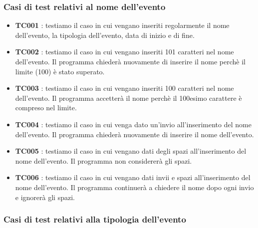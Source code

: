 \documentclass[11pt]{scrartcl} %
\begin{document}
\subsubsection{Casi di test relativi al nome dell'evento}

\begin{itemize}
	\item \textbf{TC001} : testiamo il caso in cui vengano inseriti regolarmente il nome dell’evento, la tipologia dell’evento, data di inizio e di fine.

	\item \textbf{TC002} : testiamo il caso in cui vengano inseriti 101 caratteri nel nome dell’evento. Il programma chiederà nuovamente di inserire il nome perchè il limite (100) è stato superato.

	\item \textbf{TC003} : testiamo il caso in cui vengano inseriti 100 caratteri nel nome dell’evento. Il programma accetterà il nome perchè il 100esimo carattere è compreso nel limite.

	\item \textbf{TC004} : testiamo il caso in cui venga dato un’invio all’inserimento del nome dell’evento. Il programma chiederà nuovamente di inserire il nome dell’evento.

	\item \textbf{TC005} : testiamo il caso in cui vengano dati degli spazi all’inserimento del nome dell’evento. Il programma non considererà gli spazi.

	\item \textbf{TC006} : testiamo il caso in cui vengano dati invii e spazi all’inserimento del nome dell’evento. Il programma continuerà a chiedere il nome dopo ogni invio e ignorerà gli spazi.

\end{itemize}


\subsubsection{Casi di test relativi alla tipologia dell'evento}
\end{document}
